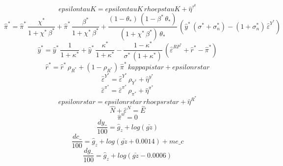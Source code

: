 \begin{dmath}
{epsilontauK}={epsilontauK}\, {rhoepstauK}+{\hat{\eta}^{\tau^k}}
\end{dmath}
\begin{dmath}
{\hat{\pi}^*}={\hat{\pi}^*}\, \frac{{\chi^*}}{1+{\chi^*}\, {\beta^*}}+{\hat{\pi}^*}\, \frac{{\beta^*}}{1+{\chi^*}\, {\beta^*}}+\frac{\left(1-{\theta_*}\right)\, \left(1-{\beta^*}\, {\theta_*}\right)}{\left(1+{\chi^*}\, {\beta^*}\right)\, {\theta_*}}\, \left({\hat{y}^*}\, \left({\sigma^*}+{\sigma^*_n}\right)-\left(1+{\sigma^*_n}\right)\, {\hat{\varepsilon}^{Y^*}}\right)
\end{dmath}
\begin{dmath}
{\hat{y}^*}={\hat{y}^*}\, \frac{1}{1+{\kappa^*}}+{\hat{y}^*}\, \frac{{\kappa^*}}{1+{\kappa^*}}-\frac{1-{\kappa^*}}{{\sigma^*}\, \left(1+{\kappa^*}\right)}\, \left({\hat{\varepsilon}^{RP^*}}+{\hat{r}^*}-{\hat{\pi}^*}\right)
\end{dmath}
\begin{dmath}
{\hat{r}^*}={\hat{r}^*}\, {\rho_{R^*}}+\left(1-{\rho_{R^*}}\right)\, {\hat{\pi}^*}\, {kappapistar}+{epsilonrstar}
\end{dmath}
\begin{dmath}
{\hat{\varepsilon}^{Y^*}}={\hat{\varepsilon}^{Y^*}}\, {\rho_{Y^*}}+{\hat{\eta}^{y^*}}
\end{dmath}
\begin{dmath}
{\hat{\varepsilon}^{\pi^*}}={\hat{\varepsilon}^{\pi^*}}\, {\rho_{\pi^*}}+{\hat{\eta}^{\pi^*}}
\end{dmath}
\begin{dmath}
{epsilonrstar}={epsilonrstar}\, {rhoepsrstar}+{\hat{\eta}^{R^*}}
\end{dmath}
\begin{dmath}
{\hat{N}}+{\hat{\varepsilon}^N}={\hat{E}}
\end{dmath}
\begin{dmath}
{\hat{\pi}^w}=0
\end{dmath}
\begin{dmath}
\frac{{dy\_}}{100}={\hat{g}_z}+log\left({\bar{gz}}\right)
\end{dmath}
\begin{dmath}
\frac{{dc\_}}{100}={\hat{g}_z}+log\left({\bar{gz}}+0.0014\right)+{me\_c}
\end{dmath}
\begin{dmath}
\frac{{dg\_}}{100}={\hat{g}_z}+log\left({\bar{gz}}-0.0006\right)
\end{dmath}
